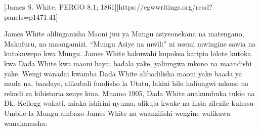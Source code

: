 [James S. White, PERGO 8.1; 1861][https://egwwritings.org/read?panels=p1471.41]

James White alilinganisha Maoni juu ya Mungu asiyeonekana na matengano, Makufuru, na maangamizi. “Mungu Asiye na mwili” ni usemi mwingine sawia na kutokuwepo kwa Mungu. James White hakuwahi kupokea karipio lolote kutoka kwa Dada White kwa maoni haya; badala yake, yaliungwa mkono na maandishi yake. Wengi wanadai kwamba Dada White alibadilisha maoni yake baada ya muda na, baadaye, alikubali fundisho la Utatu, lakini hilo haliungwi mkono na rekodi za kihistoria zenye kina. Mnamo 1905, Dada White anakumbuka tukio na Dk. Kellogg wakati, miaka ishirini nyuma, alikuja kwake na hisia zilezile kuhusu Umbile la Mungu ambazo James White na waanzilishi wengine walikuwa wanakanusha:


